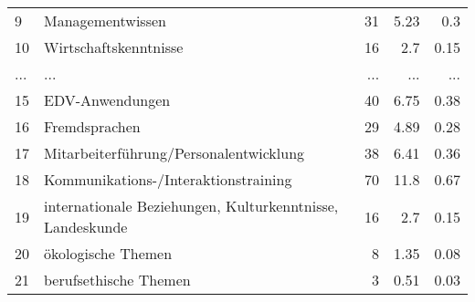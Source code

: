 \begin{longtable}{lXrrr}
        9 & \multicolumn{1}{X}{Managementwissen} & %
          \num{31} &
          \num[round-mode=places,round-precision=2]{5.23} &
          \num[round-mode=places,round-precision=2]{0.3} \\
        10 & \multicolumn{1}{X}{Wirtschaftskenntnisse} & %
          \num{16} &
          \num[round-mode=places,round-precision=2]{2.7} &
          \num[round-mode=places,round-precision=2]{0.15} \\
       ... & ... & ... & ... & ... \\
        15 & \multicolumn{1}{X}{EDV-Anwendungen} & %
          \num{40} &
          \num[round-mode=places,round-precision=2]{6.75} &
          \num[round-mode=places,round-precision=2]{0.38} \\

        16 & \multicolumn{1}{X}{Fremdsprachen} & %
          \num{29} &
          \num[round-mode=places,round-precision=2]{4.89} &
          \num[round-mode=places,round-precision=2]{0.28} \\

        17 & \multicolumn{1}{X}{Mitarbeiterführung/Personalentwicklung} & %
          \num{38} &
          \num[round-mode=places,round-precision=2]{6.41} &
          \num[round-mode=places,round-precision=2]{0.36} \\

        18 & \multicolumn{1}{X}{Kommunikations-/Interaktionstraining} & %
          \num{70} &
          \num[round-mode=places,round-precision=2]{11.8} &
          \num[round-mode=places,round-precision=2]{0.67} \\

        19 & \multicolumn{1}{X}{internationale Beziehungen, Kulturkenntnisse, Landeskunde} & %
          \num{16} &
          \num[round-mode=places,round-precision=2]{2.7} &
          \num[round-mode=places,round-precision=2]{0.15} \\

        20 & \multicolumn{1}{X}{ökologische Themen} & %
          \num{8} &
          \num[round-mode=places,round-precision=2]{1.35} &
          \num[round-mode=places,round-precision=2]{0.08} \\

        21 & \multicolumn{1}{X}{berufsethische Themen} & %
          \num{3} &
          \num[round-mode=places,round-precision=2]{0.51} &
          \num[round-mode=places,round-precision=2]{0.03} \\


\end{longtable}
